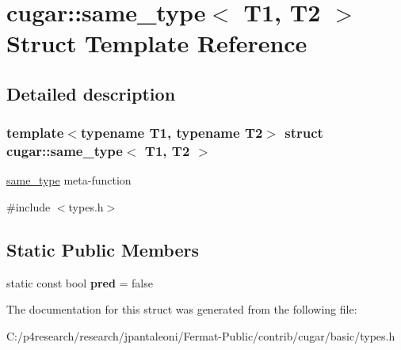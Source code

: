 \hypertarget{structcugar_1_1same__type}{}\section{cugar\+:\+:same\+\_\+type$<$ T1, T2 $>$ Struct Template Reference}
\label{structcugar_1_1same__type}


\subsection{Detailed description}
\subsubsection*{template$<$typename T1, typename T2$>$\newline
struct cugar\+::same\+\_\+type$<$ T1, T2 $>$}

\hyperlink{structcugar_1_1same__type}{same\+\_\+type} meta-\/function 

{\ttfamily \#include $<$types.\+h$>$}

\subsection*{Static Public Members}
\begin{DoxyCompactItemize}
\item 
\mbox{\label{structcugar_1_1same__type_a02606c8b26376138fcb37166a7c90f15}} 
static const bool {\bfseries pred} = false
\end{DoxyCompactItemize}


The documentation for this struct was generated from the following file\+:\begin{DoxyCompactItemize}
\item 
C\+:/p4research/research/jpantaleoni/\+Fermat-\/\+Public/contrib/cugar/basic/types.\+h\end{DoxyCompactItemize}
